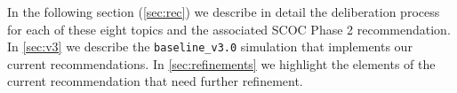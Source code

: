 In the following section (\autoref{sec:rec}) we describe in detail the deliberation process for each of these eight topics and the associated SCOC Phase 2 recommendation. In \autoref{sec:v3} we describe the \texttt{baseline\_v3.0} simulation that implements our current recommendations. In \autoref{sec:refinements} we highlight the elements of the current recommendation that need further refinement.